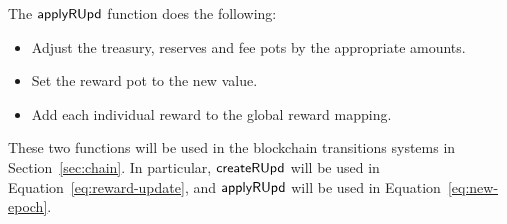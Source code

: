 The $\mathsf{applyRUpd}$ function does the following:
    \begin{itemize}
      \item Adjust the treasury, reserves and fee pots by the appropriate amounts.
      \item Set the reward pot to the new value.
      \item Add each individual reward to the global reward mapping.
    \end{itemize}

These two functions will be used in the blockchain transitions systems in Section~\ref{sec:chain}.
In particular,
$\mathsf{createRUpd}$ will be used in Equation~\ref{eq:reward-update},
and $\mathsf{applyRUpd}$ will be used in Equation~\ref{eq:new-epoch}.

